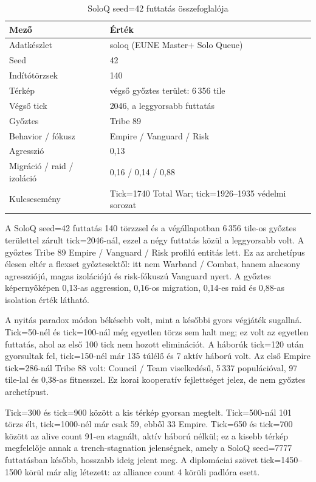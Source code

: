 \begin{table}[h]
\centering
\caption{SoloQ seed=42 futtatás összefoglalója}
\label{tab:neurosim-run-sq42-summary}
\begin{tabular}{ll}
\hline
\textbf{Mező} & \textbf{Érték} \\
\hline
Adatkészlet & soloq (EUNE Master+ Solo Queue) \\
Seed & 42 \\
Indítótörzsek & 140 \\
Térkép & végső győztes terület: 6\,356 tile \\
Végső tick & 2046, a leggyorsabb futtatás \\
Győztes & Tribe 89 \\
Behavior / fókusz & Empire / Vanguard / Risk \\
Agresszió & 0,13 \\
Migráció / raid / izoláció & 0,16 / 0,14 / 0,88 \\
Kulcsesemény & Tick=1740 Total War; tick=1926--1935 védelmi sorozat \\
\hline
\end{tabular}
\end{table}

A SoloQ seed=42 futtatás 140 törzzsel és a végállapotban 6\,356 tile-os győztes területtel zárult tick=2046-nál, ezzel a négy futtatás közül a leggyorsabb volt. A győztes Tribe 89 Empire / Vanguard / Risk profilú entitás lett. Ez az archetípus élesen eltér a flexset győztesektől: itt nem Warband / Combat, hanem alacsony agressziójú, magas izolációjú és risk-fókuszú Vanguard nyert. A győztes képernyőképen 0,13-as aggression, 0,16-os migration, 0,14-es raid és 0,88-as isolation érték látható.

A nyitás paradox módon békésebb volt, mint a későbbi gyors végjáték sugallná. Tick=50-nél és tick=100-nál még egyetlen törzs sem halt meg; ez volt az egyetlen futtatás, ahol az első 100 tick nem hozott eliminációt. A háborúk tick=120 után gyorsultak fel, tick=150-nél már 135 túlélő és 7 aktív háború volt. Az első Empire tick=286-nál Tribe 88 volt: Council / Team viselkedésű, 5\,337 populációval, 97 tile-lal és 0,38-as fitnesszel. Ez korai kooperatív fejlettséget jelez, de nem győztes archetípust.

Tick=300 és tick=900 között a kis térkép gyorsan megtelt. Tick=500-nál 101 törzs élt, tick=1000-nél már csak 59, ebből 33 Empire. Tick=650 és tick=700 között az alive count 91-en stagnált, aktív háború nélkül; ez a kisebb térkép megfelelője annak a trench-stagnation jelenségnek, amely a SoloQ seed=7777 futtatásban később, hosszabb ideig jelent meg. A diplomáciai szövet tick=1450--1500 körül már alig létezett: az alliance count 4 körüli padlóra esett.

